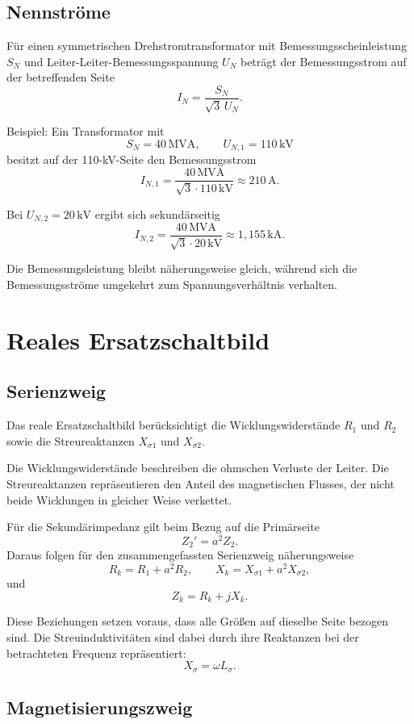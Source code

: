\subsection{Nennströme}

Für einen symmetrischen Drehstromtransformator mit Bemessungsscheinleistung
\(S_N\) und Leiter-Leiter-Bemessungsspannung \(U_N\) beträgt der Bemessungsstrom
auf der betreffenden Seite
\[
  I_N=\frac{S_N}{\sqrt{3}\,U_N}.
\]

Beispiel: Ein Transformator mit
\[
  S_N=40\,\mathrm{MVA},\qquad U_{N,1}=110\,\mathrm{kV}
\]
besitzt auf der 110-kV-Seite den Bemessungsstrom
\[
  I_{N,1}
  =\frac{40\,\mathrm{MVA}}{\sqrt{3}\cdot110\,\mathrm{kV}}
  \approx210\,\mathrm{A}.
\]

Bei \(U_{N,2}=20\,\mathrm{kV}\) ergibt sich sekundärseitig
\[
  I_{N,2}
  =\frac{40\,\mathrm{MVA}}{\sqrt{3}\cdot20\,\mathrm{kV}}
  \approx1{,}155\,\mathrm{kA}.
\]

Die Bemessungsleistung bleibt näherungsweise gleich, während sich die
Bemessungsströme umgekehrt zum Spannungsverhältnis verhalten.

\section{Reales Ersatzschaltbild}

\subsection{Serienzweig}

Das reale Ersatzschaltbild berücksichtigt die Wicklungswiderstände
\(R_1\) und \(R_2\) sowie die Streureaktanzen \(X_{\sigma 1}\) und
\(X_{\sigma 2}\).

Die Wicklungswiderstände beschreiben die ohmschen Verluste der Leiter.
Die Streureaktanzen repräsentieren den Anteil des magnetischen Flusses,
der nicht beide Wicklungen in gleicher Weise verkettet.

Für die Sekundärimpedanz gilt beim Bezug auf die Primärseite
\[
  Z_2'=a^2 Z_2.
\]
Daraus folgen für den zusammengefassten Serienzweig näherungsweise
\[
  R_k=R_1+a^2R_2,
  \qquad
  X_k=X_{\sigma 1}+a^2X_{\sigma 2},
\]
und
\[
  Z_k=R_k+jX_k.
\]

Diese Beziehungen setzen voraus, dass alle Größen auf dieselbe Seite
bezogen sind. Die Streuinduktivitäten sind dabei durch ihre Reaktanzen
bei der betrachteten Frequenz repräsentiert:
\[
  X_\sigma=\omega L_\sigma.
\]

\subsection{Magnetisierungszweig}

